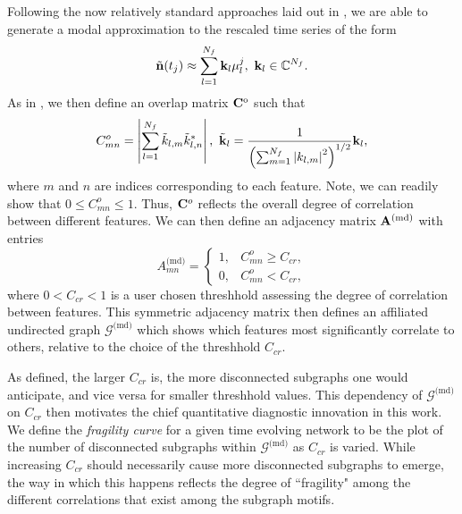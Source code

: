 \documentclass[a4paper,11pt]{article}
\begin{document}
Following the now relatively standard approaches laid out in \cite{kutz}, we are able to generate a modal approximation to the rescaled time series of the form 
\[
\tilde{{\bf n}}(t_{j}) \approx \sum_{l=1}^{N_{f}}{\bf k}_{l}\mu^{j}_{l}, ~ {\bf k}_{l} \in \mathbb{C}^{N_{f}}.
\]
As in \cite{curtis2021detection}, we then define an overlap matrix ${\bf C}^{\text{o}}$ such that 
\[
C^{o}_{mn} = \left|\sum_{l=1}^{N_{f}}\tilde{k}_{l,m}\tilde{k}^{\ast}_{l,n} \right|, ~ \tilde{{\bf k}}_{l} = \frac{1}{ \left(\sum_{m=1}^{N_{f}}\left|k_{l,m}\right|^{2} \right)^{1/2}}{\bf k}_{l},
\]
where $m$ and $n$ are indices corresponding to each feature.  Note, we can readily show that $0\leq C^{o}_{mn}\leq1$.  Thus, ${\bf C}^{o}$ reflects the overall degree of correlation between different features.  We can then define an adjacency matrix ${\bf A}^{\text{(md)}}$ with entries 
\[
A^{\text{(md)}}_{mn} = \left\{
\begin{array}{rl}
1, & C^{o}_{mn} \geq C_{cr},\\
0, & C^{o}_{mn} < C_{cr},
\end{array}
\right.
\]
where $0 < C_{cr} < 1$ is a user chosen threshhold assessing the degree of correlation between features.  This symmetric adjacency matrix then defines an affiliated undirected graph $\mathcal{G}^{\text{(md)}}$ which shows which features most significantly correlate to others, relative to the choice of the threshhold $C_{cr}$.  

As defined, the larger $C_{cr}$ is, the more disconnected subgraphs one would anticipate, and vice versa for smaller threshhold values. This dependency of $\mathcal{G}^{\text{(md)}}$ on $C_{cr}$ then motivates the chief quantitative diagnostic innovation in this work.  We define the {\it fragility curve} for a given time evolving network to be the plot of the number of disconnected subgraphs within $\mathcal{G}^{\text{(md)}}$ as $C_{cr}$ is varied.  While increasing $C_{cr}$ should necessarily cause more disconnected subgraphs to emerge, the way in which this happens reflects the degree of ``fragility" among the different correlations that exist among the subgraph motifs.  
\end{document}
